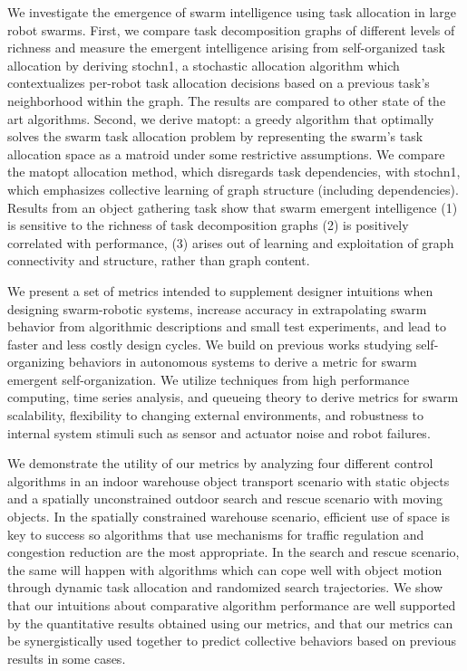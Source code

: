 

We investigate the emergence of swarm intelligence using task allocation in
large robot swarms. First, we compare task decomposition graphs of different
levels of richness and measure the emergent intelligence arising from
self-organized task allocation by deriving \gls{stochn1}, a stochastic
allocation algorithm which contextualizes per-robot task allocation decisions
based on a previous task's neighborhood within the graph. The results are
compared to other state of the art algorithms. Second, we derive \gls{matopt}: a
greedy algorithm that optimally solves the swarm task allocation problem by
representing the swarm's task allocation space as a matroid under some
restrictive assumptions. We compare the \gls{matopt} allocation method, which
disregards task dependencies, with \gls{stochn1}, which emphasizes collective
learning of graph structure (including dependencies). Results from an object
gathering task show that swarm emergent intelligence (1) is sensitive to the
richness of task decomposition graphs (2) is positively correlated with
performance, (3) arises out of learning and exploitation of graph connectivity
and structure, rather than graph content.



We present a set of metrics intended to supplement designer intuitions when
designing swarm-robotic systems, increase accuracy in extrapolating swarm
behavior from algorithmic descriptions and small test experiments, and lead to
faster and less costly design cycles. We build on previous works studying
self-organizing behaviors in autonomous systems to derive a metric for swarm
emergent self-organization.  We utilize techniques from high performance
computing, time series analysis, and queueing theory to derive metrics for swarm
scalability, flexibility to changing external environments, and robustness to
internal system stimuli such as sensor and actuator noise and robot failures.

We demonstrate the utility of our metrics by analyzing four different control
algorithms in an indoor warehouse object transport scenario with static objects
and a spatially unconstrained outdoor search and rescue scenario with moving
objects. In the spatially constrained warehouse scenario, efficient use of space
is key to success so algorithms that use mechanisms for traffic regulation and
congestion reduction are the most appropriate.  In the search and rescue
scenario, the same will happen with algorithms which can cope well with object
motion through dynamic task allocation and randomized search trajectories. We
show that our intuitions about comparative algorithm performance are well
supported by the quantitative results obtained using our metrics, and that our
metrics can be synergistically used together to predict collective behaviors
based on previous results in some cases.
